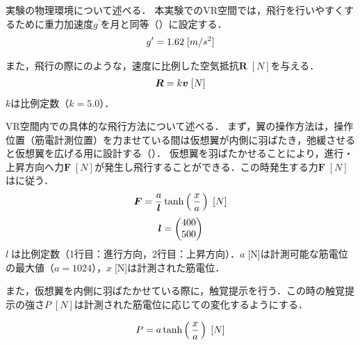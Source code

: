 \begin{small}
        実験の物理環境について述べる．
        本実験でのVR空間では，飛行を行いやすくするために重力加速度$g^{\prime}$を月と同等（）に設定する．
        \begin{eqnarray}
                \equlabel{gravity}
                g^{\prime}=1.62\;[m/s^{2}]
        \end{eqnarray}

        また，飛行の際にのような，速度に比例した空気抵抗$\bm{R}\;[N]$を与える．
        \begin{eqnarray}
                \equlabel{air_resistance}
                \bm{R}=k\bm{v} \;[N]
        \end{eqnarray}
        $k$は比例定数（$k=5.0$）．


        VR空間内での具体的な飛行方法について述べる．
        まず，翼の操作方法は，操作位置（筋電計測位置）を力ませている間は仮想翼が内側に羽ばたき，弛緩させると仮想翼を広げる用に設計する（）．
        仮想翼を羽ばたかせることにより，進行・上昇方向へ力$\bm{F}\;[N]$が発生し飛行することができる．この時発生する力$\bm{F}\;[N]$はに従う．
        \begin{eqnarray}
                \equlabel{force}
                \bm{F}=\frac{a}{\bm{l}}  \tanh\left(\,\frac{x}{a}\,\right) \;[N]
        \end{eqnarray}
        \begin{eqnarray}
                \equlabel{force_prop}
                \bm{l}=\begin{pmatrix}400 \\ 500 \end{pmatrix}
        \end{eqnarray}
        $l\;$は比例定数（1行目：進行方向，2行目：上昇方向）．$a\;$[N]は計測可能な筋電位の最大値（$a=1024$），$x\;$[N]は計測された筋電位．

        また，仮想翼を内側に羽ばたかせている際に，触覚提示を行う．この時の触覚提示の強さ$P\;[N]$は計測された筋電位に応じての変化するようにする．
        
        \begin{eqnarray}
                \equlabel{haptics}
                P=a \tanh\left(\,\frac{x}{a}\,\right) \;[N]
        \end{eqnarray}
        

\end{small}
